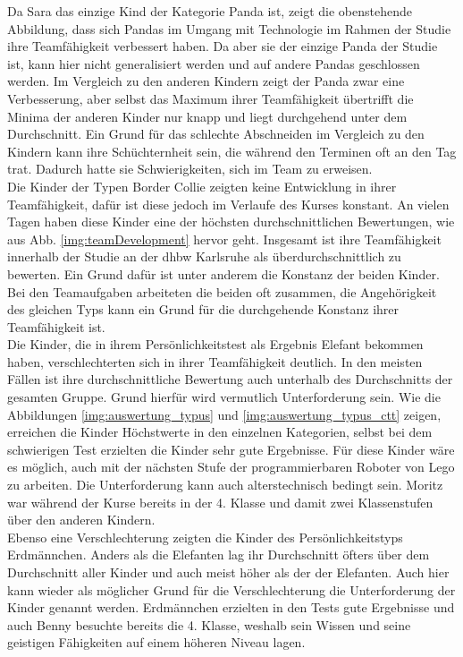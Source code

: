 Da Sara das einzige Kind der Kategorie Panda ist, zeigt die obenstehende Abbildung, dass sich Pandas im Umgang mit Technologie im Rahmen der Studie ihre Teamfähigkeit verbessert haben. Da aber sie der einzige Panda der Studie ist, kann hier nicht generalisiert werden und auf andere Pandas geschlossen werden. Im Vergleich zu den anderen Kindern zeigt der Panda zwar eine Verbesserung, aber selbst das Maximum ihrer Teamfähigkeit übertrifft die Minima der anderen Kinder nur knapp und liegt durchgehend unter dem Durchschnitt. Ein Grund für das schlechte Abschneiden im Vergleich zu den Kindern kann ihre Schüchternheit sein, die während den Terminen oft an den Tag trat. Dadurch hatte sie Schwierigkeiten, sich im Team zu erweisen.\\
Die Kinder der Typen Border Collie zeigten keine Entwicklung in ihrer Teamfähigkeit, dafür ist diese jedoch im Verlaufe des Kurses konstant. An vielen Tagen haben diese Kinder eine der höchsten durchschnittlichen Bewertungen, wie aus Abb. \ref{img:teamDevelopment} hervor geht. Insgesamt ist ihre Teamfähigkeit innerhalb der Studie an der \acrshort{dhbw} Karlsruhe als überdurchschnittlich zu bewerten. Ein Grund dafür ist unter anderem die Konstanz der beiden Kinder. Bei den Teamaufgaben arbeiteten die beiden oft zusammen, die Angehörigkeit des gleichen Typs kann ein Grund für die durchgehende Konstanz ihrer Teamfähigkeit ist.\\
Die Kinder, die in ihrem Persönlichkeitstest als Ergebnis Elefant bekommen haben, verschlechterten sich in ihrer Teamfähigkeit deutlich. In den meisten Fällen ist ihre durchschnittliche Bewertung auch unterhalb des Durchschnitts der gesamten Gruppe. Grund hierfür wird vermutlich Unterforderung sein. Wie die Abbildungen \ref{img:auswertung_typus} und \ref{img:auswertung_typus_ctt} zeigen, erreichen die Kinder Höchstwerte in den einzelnen Kategorien, selbst bei dem schwierigen Test erzielten die Kinder sehr gute Ergebnisse. Für diese Kinder wäre es möglich, auch mit der nächsten Stufe der programmierbaren Roboter von Lego zu arbeiten. Die Unterforderung kann auch alterstechnisch bedingt sein. Moritz war während der Kurse bereits in der 4. Klasse und damit zwei Klassenstufen über den anderen Kindern.\\
Ebenso eine Verschlechterung zeigten die Kinder des Persönlichkeitstyps Erdmännchen. Anders als die Elefanten lag ihr Durchschnitt öfters über dem Durchschnitt aller Kinder und auch meist höher als der der Elefanten. Auch hier kann wieder als möglicher Grund für die Verschlechterung die Unterforderung der Kinder genannt werden. Erdmännchen erzielten in den Tests gute Ergebnisse und auch Benny besuchte bereits die 4. Klasse, weshalb sein Wissen und seine geistigen Fähigkeiten auf einem höheren Niveau lagen. 


